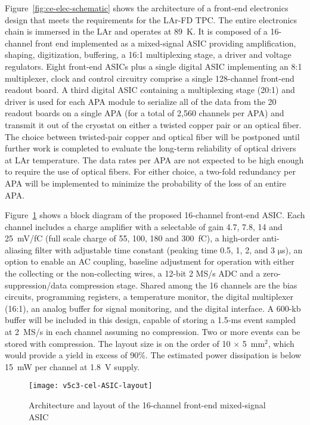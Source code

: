 Figure~\ref{fig:ce-elec-schematic} shows the architecture of a front-end electronics
design that meets the requirements for the LAr-FD TPC. The entire
electronics chain is immersed in the LAr and operates at
89~K. It is composed of a 16-channel front end implemented as a
mixed-signal ASIC providing amplification, shaping, digitization,
buffering, a 16:1 multiplexing stage, a driver and voltage regulators.
Eight front-end ASICs plus a single digital ASIC implementing an
8:1 multiplexer, clock and control circuitry comprise a 
single 128-channel front-end readout board.  A third digital ASIC containing a
multiplexing stage (20:1) and driver is used for each APA module to serialize all of the data
from the 20 readout boards on a single APA (for a total of 2,560 channels per APA) and
transmit it out of the cryostat on either a twisted copper pair or an
optical fiber. The choice between twisted-pair copper and optical fiber will be
postponed until further work is completed to evaluate the long-term reliability
of optical drivers at LAr temperature. The data rates per APA
are not expected to be high enough to require the use of optical fibers.
For either choice, a two-fold redundancy per APA will be implemented
to minimize the probability of the loss of an entire APA.


Figure~\ref{fig:ce-elec-asic-layout} shows a block diagram of the proposed 16-channel front-end
ASIC. Each channel includes a charge amplifier with a selectable of
gain 4.7, 7.8, 14 and 25~mV/fC (full scale charge of 55, 100, 180 and
300~fC), a high-order anti-aliasing filter with adjustable time
constant (peaking time 0.5, 1, 2, and 3 $\mathrm{\mu}$s), an option to enable an AC
coupling, baseline adjustment for operation with either the collecting
or the non-collecting wires, a 12-bit 2 MS/s ADC and a zero-suppression/data
compression stage. Shared among the 16 channels are the bias circuits,
programming registers, a temperature monitor, the digital multiplexer (16:1), an
analog buffer for signal monitoring, and the digital interface. A 600-kb 
buffer will be included in this design, capable of storing a 1.5-ms 
event sampled at 2~MS/s in each channel assuming no compression. Two or
more events can be stored with compression. The layout size is on the
order of 10 $\times$ 5~mm${^2}$, which would provide a
yield in excess of 90\%. The estimated power dissipation is below 15~mW
per channel at 1.8~V supply.

\begin{figure}[htbp]
\centering
\texttt{[image: v5c3-cel-ASIC-layout]}
\caption{Architecture and layout of the 16-channel front-end mixed-signal ASIC}
\label{fig:ce-elec-asic-layout}
\end{figure}

